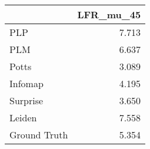 \begin{tabular}{lr}
\toprule
{} & LFR_mu_45 \\
\midrule
PLP          &     7.713 \\
PLM          &     6.637 \\
Potts        &     3.089 \\
Infomap      &     4.195 \\
Surprise     &     3.650 \\
Leiden       &     7.558 \\
Ground Truth &     5.354 \\
\bottomrule
\end{tabular}
